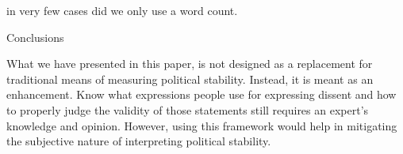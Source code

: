 \documentclass[12pt]{article}
\begin{document}
\begin{spacing}{1.5}
in very few cases did we only use a word count. 



Conclusions

What we have presented in this paper, is not designed as a replacement for traditional means of measuring political stability. Instead, it is meant as an enhancement. Know what expressions people use for expressing dissent and how to properly judge the validity of those statements still requires an expert's knowledge and opinion. However, using this framework would help in mitigating the subjective nature of interpreting political stability. 




\end{spacing}

\pagebreak




\nocite{*}
\end{document}
